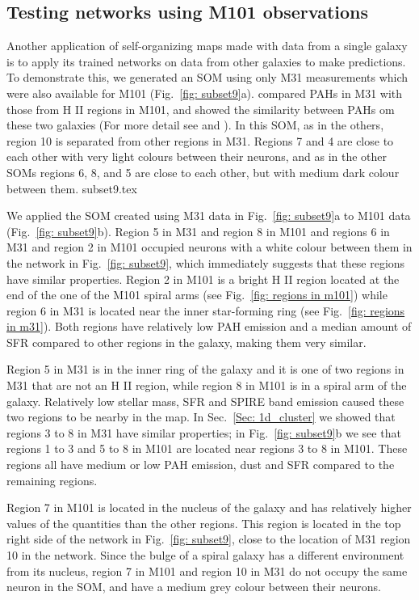     \subsection{Testing networks using M101 observations}
    Another application of self-organizing maps made with data from a single galaxy is to apply its trained networks on data from other galaxies to make predictions. %
    To demonstrate this, we generated an SOM using only M31 measurements which were also available for M101 (Fig.~\ref{fig: subset9}a). 
    \cite{Dim15} compared PAHs in M31 with those from H {\sc II} regions in M101, and showed the similarity between PAHs om these two galaxies (For more detail see \cite{Dim15} and \cite{Gordon08}).
    In this SOM, as in the others, region 10 is separated from other regions in M31.
    Regions 7 and 4 are close to each other with very light colours between their neurons, and as in the other SOMs regions 6, 8, and 5 are close to each other, but with medium dark colour between them.
    {subset9.tex}
    
    We applied the SOM created using M31 data in Fig.~\ref{fig: subset9}a to M101 data (Fig.~\ref{fig: subset9}b).
    Region 5 in M31 and region 8 in M101 and regions 6 in M31 and region 2 in M101 occupied neurons with a white colour between them in the network in Fig.~\ref{fig: subset9}, which immediately suggests that these regions have similar properties. 
    Region 2 in M101 is a bright H {\sc II} region located at the end of the one of the M101 spiral arms (see Fig.~\ref{fig: regions in m101}) while
    region 6 in M31 is located near the inner star-forming ring (see Fig.~\ref{fig: regions in m31}).
    Both regions have relatively low PAH emission and a median amount of  SFR compared to other regions in the galaxy, making them very similar.
    
    Region 5 in M31 is in the inner ring of the galaxy and it is one of two regions in M31 that are not an  H {\sc II} region, while
    region 8 in M101 is in a spiral arm of the galaxy.
    Relatively low stellar mass, SFR and SPIRE band emission caused these two regions to be nearby in the map.
    In Sec.~\ref{Sec: 1d_cluster} we showed that regions 3 to 8 in M31 have similar properties; in Fig.~\ref{fig: subset9}b we see that regions 1 to 3 and 5 to 8 in M101 are located near regions 3 to 8 in M101. 
    These regions all have medium or low PAH emission, dust and SFR compared to the remaining regions.
    
    Region 7 in M101 is located in the nucleus of the galaxy and has relatively higher values of the quantities than the other regions.
    This region is located in the top right side of the network in Fig.~\ref{fig: subset9},  close to the location of M31 region 10 in the network.
    Since the bulge of a spiral galaxy has a different environment from its nucleus, region 7 in M101 and region 10 in M31 do not occupy the same neuron in the SOM, and have a medium grey colour between their neurons.

